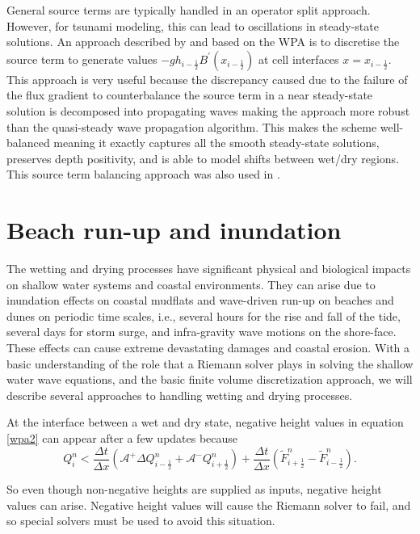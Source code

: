 \documentclass[10pt,a4paper]{article}
\begin{document}
	
	General source terms are typically handled in an operator split approach.  However, for tsunami modeling, this can lead to oscillations in steady-state solutions.  An approach described by  \citet{ba-le-mi-ro:2003} and based on the WPA is to discretise the source term to generate values $-gh_{i-\frac{1}{2}}B^{\prime}(x_{i-\frac{1}{2}})$ at  cell interfaces  $x = x_{i-\frac{1}{2}}$. This approach is very useful because the discrepancy caused due to the failure of the flux gradient to counterbalance the source term in a near steady-state solution is decomposed into propagating waves  making the approach more robust than the quasi-steady wave propagation algorithm.  This makes the scheme well-balanced  meaning it exactly captures all the smooth steady-state solutions, preserves depth positivity, and is able to model shifts between wet/dry regions. This source term balancing approach was also used in  \citet{chaabelasri1849simple}. 
	
	
	\section{Beach run-up and inundation}
	The wetting and drying processes have significant physical and biological impacts on shallow water systems and coastal environments. They can arise due to inundation effects on coastal mudflats and wave-driven run-up on beaches and dunes on periodic time scales, i.e., several hours for the rise and fall of the tide, several days for storm surge, and infra-gravity wave motions on the shore-face.  These effects can cause extreme devastating damages and coastal erosion.
	With a basic understanding of the role that a Riemann solver plays in solving the shallow water wave equations, and the basic finite volume discretization approach, we will describe several approaches to handling wetting and drying processes.  
	
	At the interface between a wet and dry state, negative height values in equation \eqref{wpa2} can appear after a few updates because
	\begin{equation}
		Q_{i}^{n} < \frac{\Delta t}{\Delta x}(\mathcal{A^{+}}\Delta 	Q_{i-\frac{1}{2}}^{n} + \mathcal{A^{-}}Q_{i+\frac{1}{2}}^{n}) + \frac{\Delta t}{\Delta x} (\tilde{F}_{i+\frac{1}{2}}^{n} - \tilde{F}_{i-\frac{1}{2}}^{n} ).
		\label{wpa22}
	\end{equation}
	
	So even though non-negative heights are supplied as inputs, negative height values can arise.  Negative height values will cause the Riemann solver to fail, and so special solvers must be used to avoid this situation.
	
\end{document}
